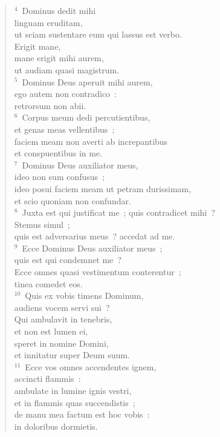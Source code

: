 \begin{flushleft}\begin{verse}${}^{4}$~Dominus dedit mihi\\ linguam eruditam,\\ ut sciam sustentare eum qui lassus est verbo.\\ Erigit mane,\\ mane erigit mihi aurem,\\ ut audiam quasi magistrum.\\
${}^{5}$~Dominus Deus aperuit mihi aurem,\\ ego autem non contradico~:\\ retrorsum non abii.\\
${}^{6}$~Corpus meum dedi percutientibus,\\ et genas meas vellentibus~;\\ faciem meam non averti ab increpantibus\\ et conspuentibus in me.\\
${}^{7}$~Dominus Deus auxiliator meus,\\ ideo non sum confusus~;\\ ideo posui faciem meam ut petram durissimam,\\ et scio quoniam non confundar.\\
${}^{8}$~Juxta est qui justificat me~; quis contradicet mihi~?\\ Stemus simul~;\\ quis est adversarius meus~? accedat ad me.\\
${}^{9}$~Ecce Dominus Deus auxiliator meus~;\\ quis est qui condemnet me~?\\ Ecce omnes quasi vestimentum conterentur~;\\ tinea comedet eos.\\
${}^{10}$~Quis ex vobis timens Dominum,\\ audiens vocem servi sui~?\\ Qui ambulavit in tenebris,\\ et non est lumen ei,\\ speret in nomine Domini,\\ et innitatur super Deum suum.\\
${}^{11}$~Ecce vos omnes accendentes ignem,\\ accincti flammis~:\\ ambulate in lumine ignis vestri,\\ et in flammis quas succendistis~;\\ de manu mea factum est hoc vobis~:\\ in doloribus dormietis.\end{verse}\end{flushleft}


